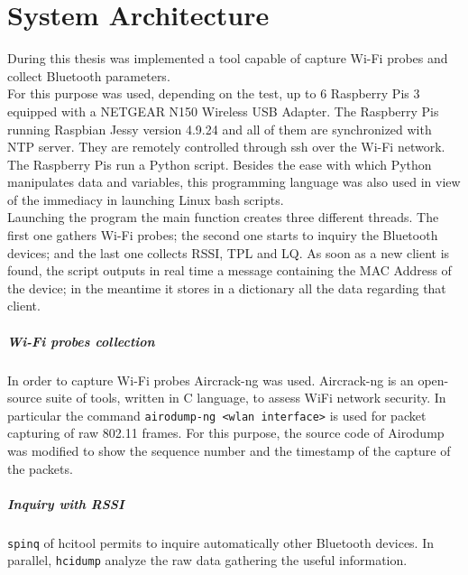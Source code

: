 \chapter{System Architecture}
\label{Chapter 4}
\thispagestyle{empty}
During this thesis was implemented a tool capable of capture Wi-Fi probes and collect Bluetooth parameters.\\
For this purpose was used, depending on the test, up to 6 Raspberry Pis 3 equipped with a NETGEAR N150 Wireless USB Adapter. The Raspberry Pis running Raspbian Jessy version 4.9.24 and all of them are synchronized with NTP server. They are remotely controlled through ssh over the Wi-Fi network.\\
\linebreak
The Raspberry Pis run a Python script. Besides the ease with which Python manipulates data and variables, this programming language was also used in view of the immediacy in launching Linux bash scripts.\\
Launching the program the main function creates three different threads. The first one gathers Wi-Fi probes; the second one starts to inquiry the Bluetooth devices; and the last one collects RSSI, TPL and LQ. As soon as a new client is found, the script outputs in real time a message containing the MAC Address of the device; in the meantime it stores in a dictionary all the data regarding that client.

\paragraph{Wi-Fi probes collection}
In order to capture Wi-Fi probes Aircrack-ng was used. Aircrack-ng is an open-source suite of tools, written in C language, to assess WiFi network security. In particular the command \texttt{airodump-ng \textless wlan interface\textgreater} is used for packet capturing of raw 802.11 frames. For this purpose, the source code of Airodump was modified to show the sequence number and the timestamp of the capture of the packets.

\paragraph{Inquiry with RSSI}
\texttt{spinq} of hcitool permits to inquire automatically other Bluetooth devices. In parallel, \texttt{hcidump} analyze the raw data gathering the useful information.

